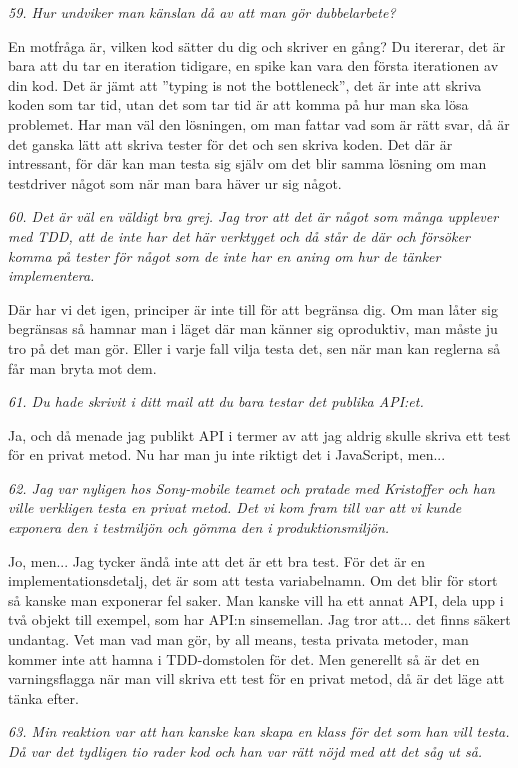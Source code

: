 \documentclass[11pt]{article}
\begin{document}
\emph{59. Hur undviker man känslan då av att man gör dubbelarbete?}

En motfråga är, vilken kod sätter du dig och skriver en gång? Du itererar, det är bara att du tar en iteration tidigare, en spike kan vara den första iterationen av din kod. Det är jämt att ”typing is not the bottleneck”, det är inte att skriva koden som tar tid, utan det som tar tid är att komma på hur man ska lösa problemet. Har man väl den lösningen, om man fattar vad som är rätt svar, då är det ganska lätt att skriva tester för det och sen skriva koden. Det där är intressant, för där kan man testa sig själv om det blir samma lösning om man testdriver något som när man bara häver ur sig något.

\emph{60. Det är väl en väldigt bra grej. Jag tror att det är något som många upplever med TDD, att de inte har det här verktyget och då står de där och försöker komma på tester för något som de inte har en aning om hur de tänker implementera.}

Där har vi det igen, principer är inte till för att begränsa dig. Om man låter sig begränsas så hamnar man i läget där man känner sig oproduktiv, man måste ju tro på det man gör. Eller i varje fall vilja testa det, sen när man kan reglerna så får man bryta mot dem.

\emph{61. Du hade skrivit i ditt mail att du bara testar det publika API:et.}

Ja, och då menade jag publikt API i termer av att jag aldrig skulle skriva ett test för en privat metod. Nu har man ju inte riktigt det i JavaScript, men...

\emph{62. Jag var nyligen hos Sony-mobile teamet och pratade med Kristoffer och han ville verkligen testa en privat metod. Det vi kom fram till var att vi kunde exponera den i testmiljön och gömma den i produktionsmiljön.}

Jo, men... Jag tycker ändå inte att det är ett bra test. För det är en implementationsdetalj, det är som att testa variabelnamn. Om det blir för stort så kanske man exponerar fel saker.  Man kanske vill ha ett annat API, dela upp i två objekt till exempel, som har API:n sinsemellan. Jag tror att... det finns säkert undantag. Vet man vad man gör, by all means, testa privata metoder, man kommer inte att hamna i TDD-domstolen för det. Men generellt så är det en varningsflagga när man vill skriva ett test för en privat metod, då är det läge att tänka efter.

\emph{63. Min reaktion var att han kanske kan skapa en klass för det som han vill testa. Då var det tydligen tio rader kod och han var rätt nöjd med att det såg ut så.}
\end{document}
